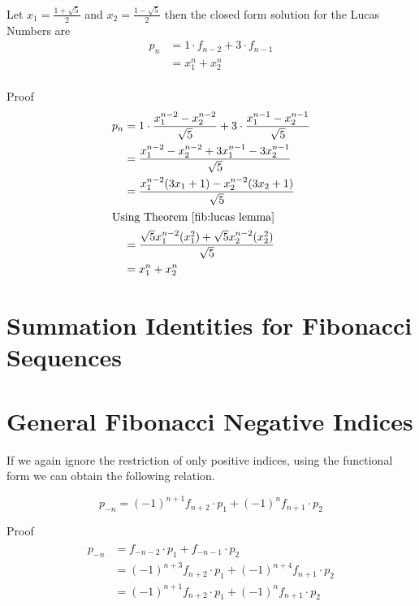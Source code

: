 \documentclass[a4paper]{article}
\begin{document}
\begin{theorem}\label{fib:lucas closed}
Let
$x_1 = \frac{1 + \sqrt{5}}{2}$ and
$x_2 = \frac{1 - \sqrt{5}}{2}$ then
the closed form solution for the Lucas Numbers are
\begin{equation}
\begin{split}
p_n &= 1 \cdot f_{n-2} + 3 \cdot f_{n-1} \\
&= x_1^n + x_2^n  \\
\end{split}\label{fib:eq:equation7}
\end{equation}

Proof
\begin{equation*}
\begin{split}
p_n &= 1 \cdot \frac{x_1^{n-2} - x_2^{n-2}}{\sqrt{5}} + 3 \cdot \frac{x_1^{n-1} - x_2^{n-1}}{\sqrt{5}} \\
&= \frac{x_1^{n-2} - x_2^{n-2} + 3x_1^{n-1} - 3x_2^{n-1} }{\sqrt{5}} \\
&= \frac{x_1^{n-2}(3x_1 + 1) - x_2^{n-2}(3x_2 + 1) }{\sqrt{5}} \\
\shortintertext{Using Theorem~\ref{fib:lucas lemma}}
&= \frac{\sqrt{5} x_1^{n-2}(x_1^2) + \sqrt{5} x_2^{n-2}(x_2^2) }{\sqrt{5}} \\
&= x_1^{n} + x_2^{n}  \\
\end{split}
\end{equation*}
\end{theorem}

\section{Summation Identities for Fibonacci Sequences}\label{fib:sec:series}


\section{General Fibonacci Negative Indices}\label{fib:sec:general-fibonacci-negative-indices}
If we again ignore the restriction of only positive indices, using the functional form we can obtain the following relation.

\begin{theorem}
\[
p_{-n} = (-1)^{n+1} f_{n+2} \cdot p_1 + (-1)^{n}f_{n+1} \cdot p_2
\]

Proof
\begin{gather*}
\begin{split}
p_{-n} &= f_{-n-2} \cdot p_1 + f_{-n-1} \cdot p_2 \\
    &= (-1)^{n+3} f_{n+2} \cdot p_1 + (-1)^{n+4} f_{n+1} \cdot p_2 \\
    &= (-1)^{n+1} f_{n+2} \cdot p_1 + (-1)^{n} f_{n+1} \cdot p_2 \\
\end{split}\\
\end{gather*}
\end{theorem}
\end{document}
